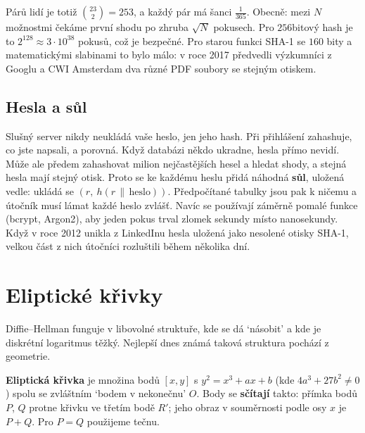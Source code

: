 Párů lidí je totiž $\binom{23}{2} = 253$, a každý pár má šanci $\frac{1}{365}$. Obecně: mezi $N$ možnostmi čekáme první shodu po zhruba $\sqrt{N}$ pokusech. Pro $256$bitový hash je to $2^{128}\approx 3\cdot 10^{38}$ pokusů, což je bezpečné. Pro starou funkci SHA-1 se $160$ bity a matematickými slabinami to bylo málo: v roce 2017 předvedli výzkumníci z Googlu a CWI Amsterdam dva různé PDF soubory se stejným otiskem.

\subsection{Hesla a sůl}

Slušný server nikdy neukládá vaše heslo, jen jeho hash. Při přihlášení zahashuje, co jste napsali, a porovná. Když databázi někdo ukradne, hesla přímo nevidí. Může ale předem zahashovat milion nejčastějších hesel a hledat shody, a stejná hesla mají stejný otisk. Proto se ke každému heslu přidá náhodná \textbf{sůl}, uložená vedle: ukládá se $(r,\ h(r\,\|\,\text{heslo}))$. Předpočítané tabulky jsou pak k ničemu a útočník musí lámat každé heslo zvlášť. Navíc se používají záměrně pomalé funkce (bcrypt, Argon2), aby jeden pokus trval zlomek sekundy místo nanosekundy. Když v roce 2012 unikla z LinkedInu hesla uložená jako nesolené otisky SHA-1, velkou část z nich útočníci rozluštili během několika dní.

\section{Eliptické křivky}

Diffie--Hellman funguje v libovolné struktuře, kde se dá `násobit' a kde je diskrétní logaritmus těžký. Nejlepší dnes známá taková struktura pochází z geometrie.

\begin{definitionbox}
  \textbf{Eliptická křivka} je množina bodů $[x, y]$ s $y^2 = x^3 + ax + b$ (kde $4a^3 + 27b^2\neq 0$) spolu se zvláštním `bodem v nekonečnu' $O$. Body se \textbf{sčítají} takto: přímka bodů $P$, $Q$ protne křivku ve třetím bodě $R'$; jeho obraz v souměrnosti podle osy $x$ je $P + Q$. Pro $P = Q$ použijeme tečnu.
\end{definitionbox}

